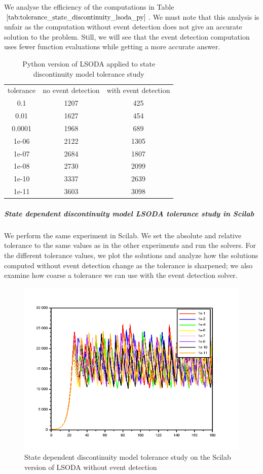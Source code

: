 We analyse the efficiency of the computations in Table $\ref{tab:tolerance_state_discontinuity_lsoda_py}$. We must note that this analysis is unfair as the computation without event detection does not give an accurate solution to the problem. Still, we will see that the event detection computation uses fewer function evaluations while getting a more accurate answer.

\begin{table}[h]
\caption {Python version of LSODA applied to state discontinuity model tolerance study} \label{tab:tolerance_state_discontinuity_lsoda_py} 
\begin{center}
\begin{tabular}{ c c c }
tolerance & no event detection & with event detection \\
0.1 & 1207 & 425 \\
0.01 & 1627 & 454 \\
0.0001 & 1968 & 689 \\
1e-06 & 2122 & 1305 \\
1e-07 & 2684 & 1807 \\
1e-08 & 2730 & 2099 \\
1e-10 & 3337 & 2639 \\
1e-11 & 3603 & 3098 \\
\end{tabular}
\end{center}
\end{table}

\subparagraph{State dependent discontinuity model LSODA tolerance study in Scilab}

We perform the same experiment in Scilab. We set the absolute and relative tolerance to the same values as in the other experiments and run the solvers. For the different tolerance values, we plot the solutions and analyze how the solutions computed without event detection change as the tolerance is sharpened; we also examine how coarse a tolerance we can use with the event detection solver.

\begin{figure}[h]
\centering
\includegraphics[width=0.7\linewidth]{./figures/tolerance_state_lsoda_no_event_sci}
\caption{State dependent discontinuity model tolerance study on the Scilab version of LSODA without event detection}
\label{fig:tolerance_state_lsoda_no_event_sci}
\end{figure}

